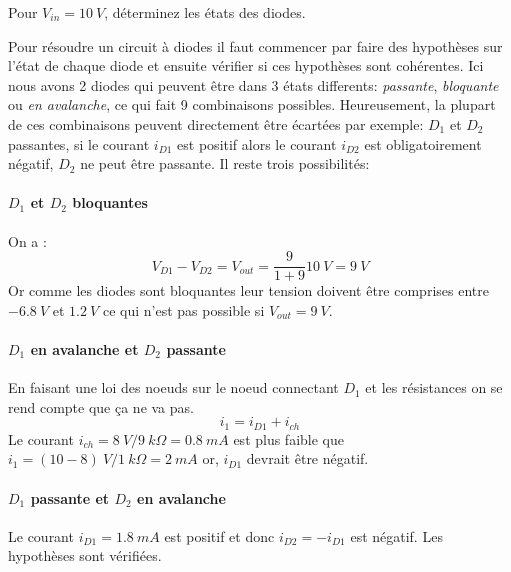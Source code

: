 \documentclass{../template/tp}
\begin{document}
\Question
{
    Pour $ V_{in} = 10~V $, déterminez les états des diodes.
}{
    Pour résoudre un circuit à diodes il faut commencer par faire des hypothèses sur l'état de chaque diode et ensuite vérifier si ces hypothèses sont cohérentes. Ici nous avons 2 diodes qui peuvent être dans 3 états differents: \textit{passante}, \textit{bloquante} ou \textit{en avalanche}, ce qui fait 9 combinaisons possibles. Heureusement, la plupart de ces combinaisons peuvent directement être écartées par exemple: $ D_{1} $ et $ D_{2} $ passantes, si le courant $ i_{D1} $ est positif alors le courant $ i_{D2} $ est obligatoirement négatif, $ D_{2} $ ne peut être passante. Il reste trois possibilités:
    
    \paragraph{$ D_{1} $ et $ D_{2} $ bloquantes} 
    On a :
    \[ V_{D1} - V_{D2} = V_{out} = \frac{9}{1+9} 10~V = 9~V \]
    Or comme les diodes sont bloquantes leur tension doivent être comprises entre $ -6.8~V $ et $ 1.2~V $ ce qui n'est pas possible si $ V_{out} = 9~V $.
    
    \paragraph{$ D_{1} $ en avalanche et $ D_{2} $ passante}
    En faisant une loi des noeuds sur le noeud connectant $ D_{1} $ et les résistances on se rend compte que ça ne va pas.
    \[
        i_{1} = i_{D1} + i_{ch} 
    \]
    Le courant $ i_{ch} = 8~V / 9~k\Omega = 0.8~mA $ est plus faible que $ i_{1} = (10-8)~V / 1~k\Omega = 2~mA $ or, $ i_{D1} $ devrait être négatif.
    
    \paragraph{$ D_{1} $ passante et $ D_{2} $ en avalanche}
    Le courant $ i_{D1} = 1.8~mA $ est positif et donc $ i_{D2} = - i_{D1} $ est négatif.
    Les hypothèses sont vérifiées.
    
}
\end{document}
